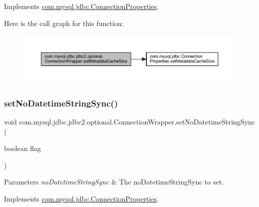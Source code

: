Implements \mbox{\hyperlink{interfacecom_1_1mysql_1_1jdbc_1_1_connection_properties_aa29a8dc1d36b7044717dce95a3ddbc4e}{com.\+mysql.\+jdbc.\+Connection\+Properties}}.

Here is the call graph for this function\+:
\nopagebreak
\begin{figure}[H]
\begin{center}
\leavevmode
\includegraphics[width=350pt]{classcom_1_1mysql_1_1jdbc_1_1jdbc2_1_1optional_1_1_connection_wrapper_aa2b3fbef9bed38d8dd555e8f0f7c3598_cgraph}
\end{center}
\end{figure}
\mbox{\label{classcom_1_1mysql_1_1jdbc_1_1jdbc2_1_1optional_1_1_connection_wrapper_a5df2417575df4f6bdb7ba14ffc39b979}} 
\subsubsection{\texorpdfstring{set\+No\+Datetime\+String\+Sync()}{setNoDatetimeStringSync()}}
{\footnotesize\ttfamily void com.\+mysql.\+jdbc.\+jdbc2.\+optional.\+Connection\+Wrapper.\+set\+No\+Datetime\+String\+Sync (\begin{DoxyParamCaption}\item[{boolean}]{flag }\end{DoxyParamCaption})}


\begin{DoxyParams}{Parameters}
{\em no\+Datetime\+String\+Sync} & The no\+Datetime\+String\+Sync to set. \\
\hline
\end{DoxyParams}


Implements \mbox{\hyperlink{interfacecom_1_1mysql_1_1jdbc_1_1_connection_properties_a01c8815660b50a6db2e6f89f796e3ee9}{com.\+mysql.\+jdbc.\+Connection\+Properties}}.

